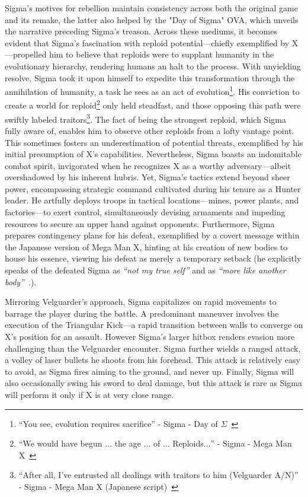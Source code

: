 Sigma's motives for rebellion maintain consistency across both the original game and its remake, the latter also helped by the "Day of Sigma" OVA, which unveils the narrative preceding Sigma's treason. Across these mediums, it becomes evident that Sigma's fascination with reploid potential—chiefly exemplified by X—propelled him to believe that reploids were to supplant humanity in the evolutionary hierarchy, rendering humans an halt to the process. With unyielding resolve, Sigma took it upon himself to expedite this transformation through the annihilation of humanity, a task he sees as an act of evolution\footnote{\enquote{You see, evolution requires sacrifice} - Sigma - Day of $\Sigma$~\cite{wiki:Day_of_Sigma_Script}}. His conviction to create a world for reploid\footnote{\enquote{We would have begun $\dots$ the age $\dots$ of $\dots$ Reploids$\dots$} - Sigma - Mega Man X~\cite{wiki:MMX_script}} only held steadfast, and those opposing this path were swiftly labeled traitors\footnote{\enquote{After all, I’ve entrusted all dealings with traitors to him (Velguarder A/N)} - Sigma - Mega Man X (Japanese script)~\cite{wordpress:X_japanese_script}}. The fact of being the strongest reploid, which Sigma fully aware of, enables him to observe other reploids from a lofty vantage point. This sometimes fosters an underestimation of potential threats, exemplified by his initial presumption of X's capabilities. Nevertheless, Sigma boasts an indomitable combat spirit, invigorated when he recognizes X as a worthy adversary—albeit overshadowed by his inherent hubris. Yet, Sigma's tactics extend beyond sheer power, encompassing strategic command cultivated during his tenure as a Hunter leader. He artfully deploys troops in tactical locations—mines, power plants, and factories—to exert control, simultaneously devising armaments and impeding resources to secure an upper hand against opponents. Furthermore, Sigma prepares contingency plans for his defeat, exemplified by a covert message within the Japanese version of Mega Man X, hinting at his creation of new bodies to house his essence, viewing his defeat as merely a temporary setback (he explicitly speaks of the defeated Sigma as \textit{``not my true self''} and as \textit{``more like another body''}~\cite{wordpress:X_japanese_script}.).

Mirroring Velguarder's approach, Sigma capitalizes on rapid movements to barrage the player during the battle. A predominant maneuver involves the execution of the Triangular Kick—a rapid transition between walls to converge on X's position for an assault. However Sigma's larger hitbox renders evasion more challenging than the Velguarder encounter. Sigma further wields a ranged attack, a volley of laser bullets he shoots from his forehead. This attack is relatively easy to avoid, as Sigma fires aiming to the ground, and never up. Finally, Sigma will also occasionally swing his sword to deal damage, but this attack is rare as Sigma will perform it only if X is at very close range.

